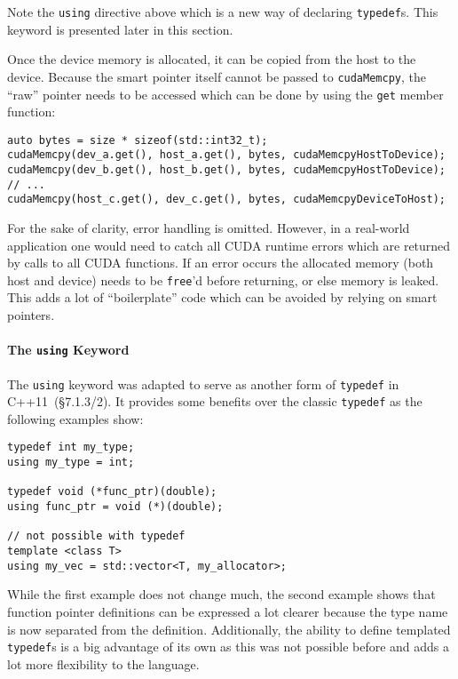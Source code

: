 \noindent Note the \texttt{using} directive above which is a new way of declaring \texttt{typedef}s. This keyword is presented later in this section.

Once the device memory is allocated, it can be copied from the host to the device. Because the smart pointer itself cannot be passed to \texttt{cudaMemcpy}, the ``raw'' pointer needs to be accessed which can be done by using the \texttt{get} member function:

\begin{verbatim}
auto bytes = size * sizeof(std::int32_t);
cudaMemcpy(dev_a.get(), host_a.get(), bytes, cudaMemcpyHostToDevice);
cudaMemcpy(dev_b.get(), host_b.get(), bytes, cudaMemcpyHostToDevice);
// ...
cudaMemcpy(host_c.get(), dev_c.get(), bytes, cudaMemcpyDeviceToHost);
\end{verbatim}

\noindent For the sake of clarity, error handling is omitted. However, in a real-world application one would need to catch all CUDA runtime errors which are returned by calls to all CUDA functions. If an error occurs the allocated memory (both host and device) needs to be \texttt{free}'d before returning, or else memory is leaked. This adds a lot of ``boilerplate'' code which can be avoided by relying on smart pointers.

\paragraph{The \texttt{using} Keyword}

The \texttt{using} keyword was adapted to serve as another form of \texttt{typedef} in C++11~\cite{cpp11std}(§7.1.3/2). It provides some benefits over the classic \texttt{typedef} as the following examples show:

\begin{verbatim}
typedef int my_type;
using my_type = int;

typedef void (*func_ptr)(double);
using func_ptr = void (*)(double);

// not possible with typedef
template <class T>
using my_vec = std::vector<T, my_allocator>;
\end{verbatim}

\noindent While the first example does not change much, the second example shows that function pointer definitions can be expressed a lot clearer because the type name is now separated from the definition. Additionally, the ability to define templated \texttt{typedef}s is a big advantage of its own as this was not possible before and adds a lot more flexibility to the language.

